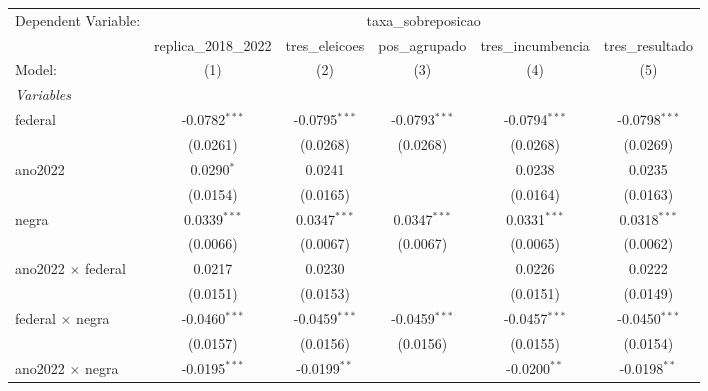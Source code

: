 
\begingroup
\centering
\begin{tabular}{lccccc}
   \tabularnewline \midrule \midrule
   Dependent Variable: & \multicolumn{5}{c}{taxa\_sobreposicao}\\
                                             & replica\_2018\_2022   & tres\_eleicoes  & pos\_agrupado   & tres\_incumbencia  & tres\_resultado \\    
   Model:                                    & (1)                   & (2)             & (3)             & (4)                & (5)\\  
   \midrule
   \emph{Variables}\\
   federal                                   & -0.0782$^{***}$       & -0.0795$^{***}$ & -0.0793$^{***}$ & -0.0794$^{***}$    & -0.0798$^{***}$\\   
                                             & (0.0261)              & (0.0268)        & (0.0268)        & (0.0268)           & (0.0269)\\   
   ano2022                                   & 0.0290$^{*}$          & 0.0241          &                 & 0.0238             & 0.0235\\   
                                             & (0.0154)              & (0.0165)        &                 & (0.0164)           & (0.0163)\\   
   negra                                     & 0.0339$^{***}$        & 0.0347$^{***}$  & 0.0347$^{***}$  & 0.0331$^{***}$     & 0.0318$^{***}$\\   
                                             & (0.0066)              & (0.0067)        & (0.0067)        & (0.0065)           & (0.0062)\\   
   ano2022 $\times$ federal                  & 0.0217                & 0.0230          &                 & 0.0226             & 0.0222\\   
                                             & (0.0151)              & (0.0153)        &                 & (0.0151)           & (0.0149)\\   
   federal $\times$ negra                    & -0.0460$^{***}$       & -0.0459$^{***}$ & -0.0459$^{***}$ & -0.0457$^{***}$    & -0.0450$^{***}$\\   
                                             & (0.0157)              & (0.0156)        & (0.0156)        & (0.0155)           & (0.0154)\\   
   ano2022 $\times$ negra                    & -0.0195$^{***}$       & -0.0199$^{**}$  &                 & -0.0200$^{**}$     & -0.0198$^{**}$\\   

\end{tabular}
